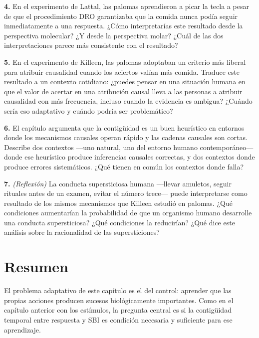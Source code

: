 \documentclass[
  letterpaper,
  DIV=11,
  numbers=noendperiod]{scrreprt}
\begin{document}
\begin{tcolorbox}[enhanced jigsaw, toprule=.15mm, arc=.35mm, colback=white, opacityback=0, colframe=quarto-callout-note-color-frame, breakable, rightrule=.15mm, left=2mm, leftrule=.75mm, bottomrule=.15mm]
\textbf{4.} En el experimento de Lattal, las palomas aprendieron a picar
la tecla a pesar de que el procedimiento DRO garantizaba que la comida
nunca podía seguir inmediatamente a una respuesta. ¿Cómo interpretarías
este resultado desde la perspectiva molecular? ¿Y desde la perspectiva
molar? ¿Cuál de las dos interpretaciones parece más consistente con el
resultado?

\textbf{5.} En el experimento de Killeen, las palomas adoptaban un
criterio más liberal para atribuir causalidad cuando los aciertos valían
más comida. Traduce este resultado a un contexto cotidiano: ¿puedes
pensar en una situación humana en que el valor de acertar en una
atribución causal lleva a las personas a atribuir causalidad con más
frecuencia, incluso cuando la evidencia es ambigua? ¿Cuándo sería eso
adaptativo y cuándo podría ser problemático?

\textbf{6.} El capítulo argumenta que la contigüidad es un buen
heurístico en entornos donde los mecanismos causales operan rápido y las
cadenas causales son cortas. Describe dos contextos ---uno natural, uno
del entorno humano contemporáneo--- donde ese heurístico produce
inferencias causales correctas, y dos contextos donde produce errores
sistemáticos. ¿Qué tienen en común los contextos donde falla?

\textbf{7.} \emph{(Reflexión)} La conducta supersticiosa humana
---llevar amuletos, seguir rituales antes de un examen, evitar el número
trece--- puede interpretarse como resultado de los mismos mecanismos que
Killeen estudió en palomas. ¿Qué condiciones aumentarían la probabilidad
de que un organismo humano desarrolle una conducta supersticiosa? ¿Qué
condiciones la reducirían? ¿Qué dice este análisis sobre la racionalidad
de las supersticiones?

\section{Resumen}\label{resumen-3}

El problema adaptativo de este capítulo es el del control: aprender que
las propias acciones producen sucesos biológicamente importantes. Como
en el capítulo anterior con los estímulos, la pregunta central es si la
contigüidad temporal entre respuesta y SBI es condición necesaria y
suficiente para ese aprendizaje.


\end{tcolorbox}
\end{document}
